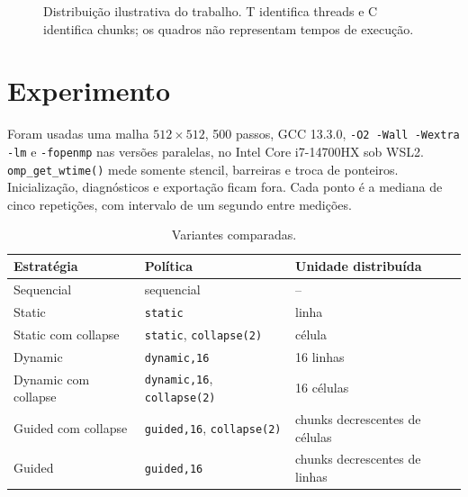 \documentclass[11pt,letterpaper]{article}
\begin{document}
\begin{figure}[H]
\caption{Distribuição ilustrativa do trabalho. T identifica threads e C identifica chunks;
os quadros não representam tempos de execução.}
\label{fig:distribuicao}\end{figure}


\section{Experimento}
Foram usadas uma malha $512\times512$, 500 passos, GCC 13.3.0, \texttt{-O2 -Wall -Wextra -lm} e \texttt{-fopenmp} nas versões paralelas, no Intel Core i7-14700HX sob WSL2. \texttt{omp\_get\_wtime()} mede somente stencil, barreiras e troca de ponteiros. Inicialização, diagnósticos e exportação ficam fora. Cada ponto é a mediana de cinco repetições, com intervalo de um segundo entre medições.

\begin{table}[H]\centering
\begin{tabular}{lll}\hline
Estratégia & Política & Unidade distribuída\\\hline
Sequencial & sequencial & --\\
Static & \texttt{static} & linha\\
Static com collapse & \texttt{static}, \texttt{collapse(2)} & célula\\
Dynamic & \texttt{dynamic,16} & 16 linhas\\
Dynamic com collapse & \texttt{dynamic,16}, \texttt{collapse(2)} & 16 células\\
Guided com collapse & \texttt{guided,16}, \texttt{collapse(2)} & chunks decrescentes de células\\
Guided & \texttt{guided,16} & chunks decrescentes de linhas\\\hline
\end{tabular}\caption{Variantes comparadas.}\end{table}
\end{document}
